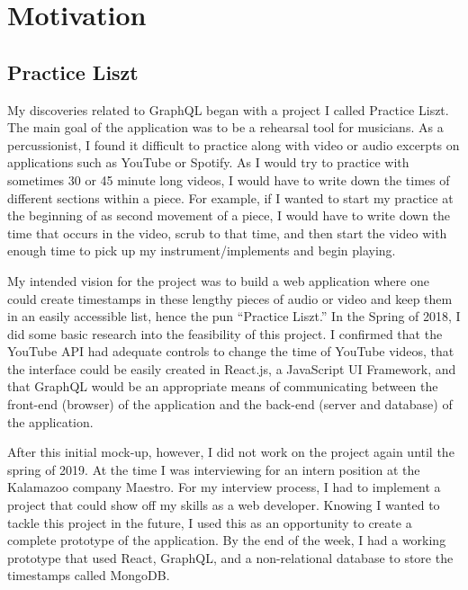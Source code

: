 \section{Motivation}

\subsection{Practice Liszt}
My discoveries related to GraphQL began with a project I called Practice Liszt.  The main goal of the application was to be a rehearsal tool for musicians. As a percussionist, I found it difficult to practice along with video or audio excerpts on applications such as YouTube or Spotify.  As I would try to practice with sometimes 30 or 45 minute long videos, I would have to write down the times of different sections within a piece.  For example, if I wanted to start my practice at the beginning of as second movement of a piece, I would have to write down the time that occurs in the video, scrub to that time, and then start the video with enough time to pick up my instrument/implements and begin playing.

My intended vision for the project was to build a web application where one could create timestamps in these lengthy pieces of audio or video and keep them in an easily accessible list, hence the pun ``Practice Liszt.'' In the Spring of 2018, I did some basic research into the feasibility of this project.  I confirmed that the YouTube API had adequate controls to change the time of YouTube videos, that the interface could be easily created in React.js, a JavaScript UI Framework, and that GraphQL would be an appropriate means of communicating between the front-end (browser) of the application and the back-end (server and database) of the application.

After this initial mock-up, however, I did not work on the project again until the spring of 2019.  At the time I was interviewing for an intern position at the Kalamazoo company Maestro.  For my interview process, I had to implement a project that could show off my skills as a web developer.  Knowing I wanted to tackle this project in the future, I used this as an opportunity to create a complete prototype of the application.  By the end of the week, I had a working prototype that used React, GraphQL, and a non-relational database to store the timestamps called MongoDB.

